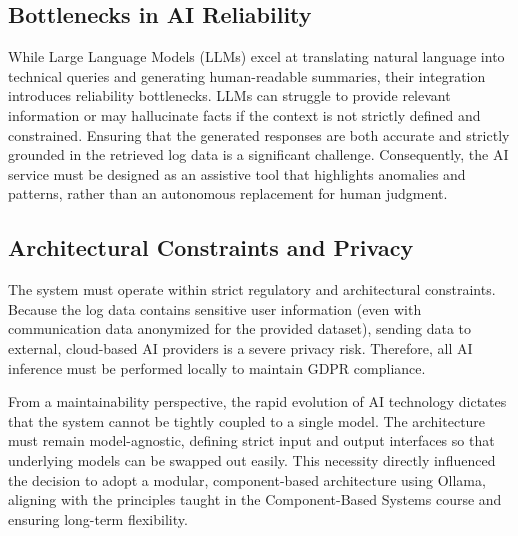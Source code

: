 \subsection{Bottlenecks in AI Reliability}
While Large Language Models (LLMs) excel at translating natural language into technical queries and generating human-readable summaries, their integration introduces reliability bottlenecks. LLMs can struggle to provide relevant information or may hallucinate facts if the context is not strictly defined and constrained. Ensuring that the generated responses are both accurate and strictly grounded in the retrieved log data is a significant challenge. Consequently, the AI service must be designed as an assistive tool that highlights anomalies and patterns, rather than an autonomous replacement for human judgment.

\subsection{Architectural Constraints and Privacy}
The system must operate within strict regulatory and architectural constraints. Because the log data contains sensitive user information (even with communication data anonymized for the provided dataset), sending data to external, cloud-based AI providers is a severe privacy risk. Therefore, all AI inference must be performed locally to maintain GDPR compliance.

From a maintainability perspective, the rapid evolution of AI technology dictates that the system cannot be tightly coupled to a single model. The architecture must remain model-agnostic, defining strict input and output interfaces so that underlying models can be swapped out easily. This necessity directly influenced the decision to adopt a modular, component-based architecture using Ollama, aligning with the principles taught in the Component-Based Systems course and ensuring long-term flexibility.
\pagebreak